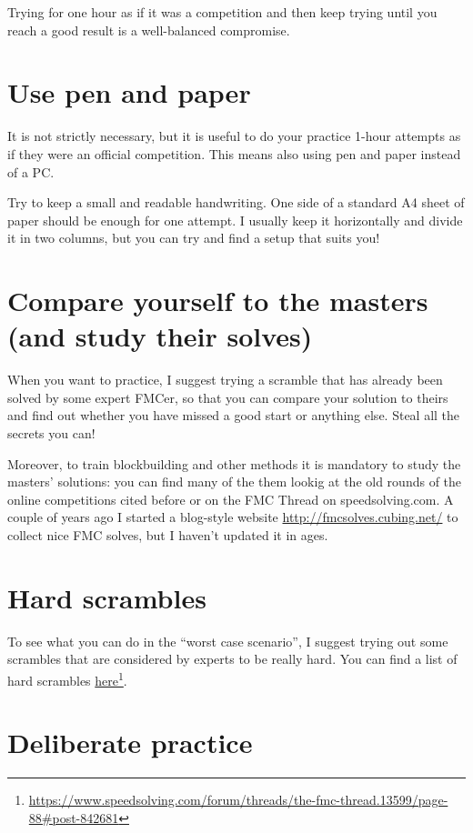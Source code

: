 \documentclass[11pt,a4paper]{book}
\begin{document}
Trying for one hour as if it was a competition and then keep trying until you reach a good result is a well-balanced compromise.

\section{Use pen and paper}

It is not strictly necessary, but it is useful to do your practice 1-hour attempts as if they were an official competition. This means also using pen and paper instead of a PC.

Try to keep a small and readable handwriting. One side of a standard A4 sheet of paper should be enough for one attempt. I usually keep it horizontally and divide it in two columns, but you can try and find a setup that suits you!

\section{Compare yourself to the masters (and study their solves)}

When you want to practice, I suggest trying a scramble that has already been solved by some expert FMCer, so that you can compare your solution to theirs and find out whether you have missed a good start or anything else. Steal all the secrets you can!

Moreover, to train blockbuilding and other methods it is mandatory to study the masters' solutions: you can find many of the them lookig at the old rounds of the online competitions cited before or on the FMC Thread on speedsolving.com. A couple of years ago I started a blog-style website \url{http://fmcsolves.cubing.net/} to collect nice FMC solves, but I haven't updated it in ages.

\section{Hard scrambles}

To see what you can do in the ``worst case scenario'', I suggest trying out some scrambles that are considered by experts to be really hard. You can find a list of hard scrambles \href{https://www.speedsolving.com/forum/threads/the-fmc-thread.13599/page-88\#post-842681}{here}\footnote{\url{https://www.speedsolving.com/forum/threads/the-fmc-thread.13599/page-88\#post-842681}}.

\section{Deliberate practice}
\end{document}
